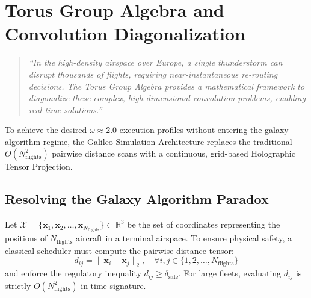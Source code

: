 \documentclass[11pt,a4paper]{book}
\begin{document}
\section{Torus Group Algebra and Convolution Diagonalization}\label{sec:torus_group_algebra}
\begin{quote}
    \textit{``In the high-density airspace over Europe, a single thunderstorm can disrupt thousands of flights, requiring near-instantaneous re-routing decisions. The Torus Group Algebra provides a mathematical framework to diagonalize these complex, high-dimensional convolution problems, enabling real-time solutions.''}
\end{quote}

To achieve the desired $\omega \approx 2.0$ execution profiles without entering the galaxy algorithm regime, the Galileo Simulation Architecture replaces the traditional $O(N_{\text{flights}}^2)$ pairwise distance scans with a continuous, grid-based Holographic Tensor Projection.

\subsection{Resolving the Galaxy Algorithm Paradox}\label{subsec:galaxy_paradox}
Let $\mathcal{X} = \{\mathbf{x}_1, \mathbf{x}_2, \dots, \mathbf{x}_{N_{\text{flights}}}\} \subset \mathbb{R}^3$ be the set of coordinates representing the positions of $N_{\text{flights}}$ aircraft in a terminal airspace. To ensure physical safety, a classical scheduler must compute the pairwise distance tensor:
\begin{equation}
\label{eq:pairwise_distance}
d_{ij} = \lVert \mathbf{x}_i - \mathbf{x}_j \rVert_2, \quad \forall i, j \in \{1, 2, \dots, N_{\text{flights}}\}
\end{equation}
and enforce the regulatory inequality $d_{ij} \ge \delta_{\text{safe}}$. For large fleets, evaluating $d_{ij}$ is strictly $O(N_{\text{flights}}^2)$ in time signature. 
\end{document}
